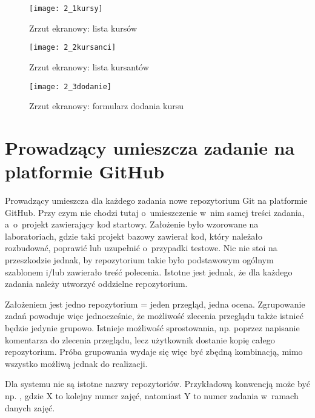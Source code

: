 \medskip
\begin{figure}[!h]
\centering
    \texttt{[image: 2\_1kursy]}
    \caption{Zrzut ekranowy: lista kursów}
    \label{obr21}
\end{figure}

\begin{figure}[!h]
\centering
    \texttt{[image: 2\_2kursanci]}
    \caption{Zrzut ekranowy: lista kursantów}
    \label{obr22}
\end{figure}

\begin{figure}[!h]
\centering
    \texttt{[image: 2\_3dodanie]}
    \caption{Zrzut ekranowy: formularz dodania kursu}
    \label{obr23}
\end{figure}

\clearpage
\section{Prowadzący umieszcza zadanie na platformie GitHub}
Prowadzący umieszcza dla każdego zadania nowe repozytorium Git na platformie GitHub. Przy czym nie chodzi tutaj o~umieszczenie w~nim samej treści zadania, a~o~projekt zawierający kod startowy. Założenie było wzorowane na laboratoriach, gdzie taki projekt bazowy zawierał kod, który należało rozbudować, poprawić lub uzupełnić o~przypadki testowe. Nic nie stoi na przeszkodzie jednak, by repozytorium takie było podstawowym ogólnym szablonem i/lub zawierało treść polecenia. Istotne jest jednak, że dla każdego zadania należy utworzyć oddzielne repozytorium.

\medskip
Założeniem jest jedno repozytorium = jeden przegląd, jedna ocena. Zgrupowanie zadań powoduje więc jednocześnie, że możliwość zlecenia przeglądu także istnieć będzie jedynie grupowo. Istnieje możliwość sprostowania, np. poprzez napisanie komentarza do zlecenia przeglądu, lecz użytkownik dostanie kopię całego repozytorium. Próba grupowania wydaje się więc być zbędną kombinacją, mimo wszystko możliwą jednak do realizacji.

\medskip
Dla systemu nie są istotne nazwy repozytoriów. Przykładową konwencją może być np. , gdzie X to kolejny numer zajęć, natomiast Y to numer zadania w~ramach danych zajęć.

\clearpage
